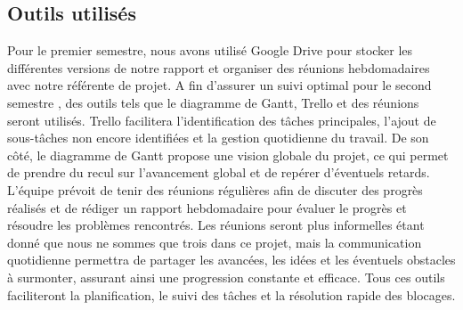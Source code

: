 \subsection{Outils utilisés}

Pour le premier semestre, nous avons utilisé Google Drive pour stocker les 
différentes versions de notre rapport et organiser des réunions hebdomadaires 
avec notre référente de projet. A fin d'assurer un suivi optimal pour le second semestre , des outils tels que le diagramme de Gantt, 
Trello et des réunions seront utilisés. Trello facilitera l'identification des tâches principales, l'ajout de 
sous-tâches non encore identifiées et la gestion quotidienne du travail. 
De son côté, le diagramme de Gantt propose une vision globale du projet, ce qui 
permet de prendre du recul sur l'avancement global et de repérer d'éventuels 
retards. L'équipe prévoit de tenir des réunions régulières afin de discuter des 
progrès réalisés et de rédiger un rapport hebdomadaire pour évaluer le progrès et 
résoudre les problèmes rencontrés. Les réunions seront plus informelles étant 
donné que nous ne sommes que trois dans ce projet, mais la communication 
quotidienne permettra de partager les avancées, les idées et les éventuels 
obstacles à surmonter, assurant ainsi une progression constante et efficace. 
Tous ces outils faciliteront la planification, le suivi des tâches et la 
résolution rapide des blocages.
